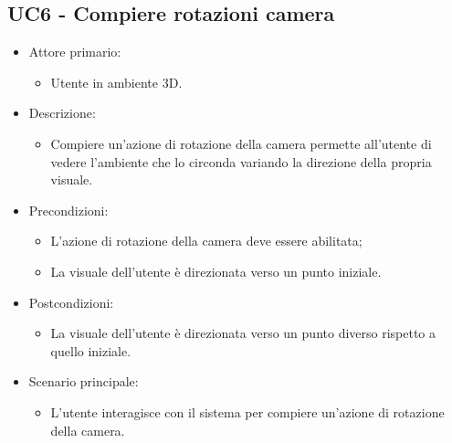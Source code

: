 \subsection{UC6 - Compiere rotazioni camera}
\begin{itemize}

	\item Attore primario: 
	\begin{itemize}
		\item Utente in ambiente 3D.
	\end{itemize}
	\item Descrizione:
	\begin{itemize}
		\item Compiere un'azione di rotazione della camera permette all'utente di vedere l'ambiente che lo circonda variando la direzione della propria visuale.
	\end{itemize}
	
	\item Precondizioni:
	\begin{itemize}
		\item L'azione di rotazione della camera deve essere abilitata;
		\item La visuale dell'utente è direzionata verso un punto iniziale.
	\end{itemize}
	
	\item Postcondizioni:
	\begin{itemize}
		\item La visuale dell'utente è direzionata verso un punto diverso rispetto a quello iniziale.
	\end{itemize}
	
	\item Scenario principale:
	\begin{itemize}
		\item L'utente interagisce con il sistema per compiere un'azione di rotazione della camera.
	\end{itemize}
	
\end{itemize}

\pagebreak

